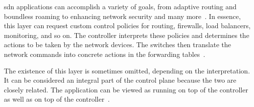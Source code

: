 \gls{sdn} applications can accomplish a variety of goals, from adaptive routing and boundless roaming to enhancing network security and many more~\cite{xia_survey_2015}. In essence, this layer can request custom control policies for routing, firewalls, load balancers, monitoring, and so on. The controller interprets these policies and determines the actions to be taken by the network devices. The switches then translate the network commands into concrete actions in the forwarding tables~\cite{kreutz_software-defined_2015}. 

The existence of this layer is sometimes omitted, depending on the interpretation. It can be considered an integral part of the control plane because the two are closely related. The application can be viewed as running on top of the controller as well as on top of the controller~\cite{peterson_software-defined_2021}.

